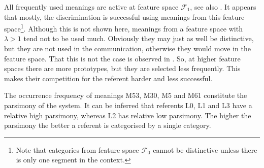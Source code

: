 All frequently used meanings are active at feature space ${\mathcal F}_1$, see also . It appears that mostly, the discrimination is successful using meanings from this feature space\footnote{Note that categories from feature space ${\mathcal F}_0$ cannot be distinctive unless there is only one segment in the context.}. Although this is not shown here, meanings from a feature space with $\lambda>1$ tend not to be used much. Obviously they may just as well be distinctive, but they are not used in the communication, otherwise they would move in the feature space. That this is not the case is observed in . So, at higher feature spaces there are more prototypes, but they are selected less frequently. This makes their competition for the referent harder and less successful.

The occurrence frequency of meanings M53, M30, M5 and M61 constitute the parsimony of the system. It can be inferred that referents L0, L1 and L3 have a relative high parsimony, whereas L2 has relative low parsimony. The higher the parsimony the better a referent is categorised by a single category.

